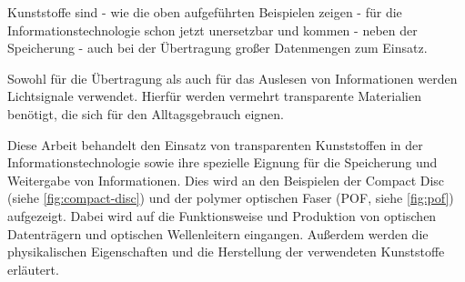 Kunststoffe sind - wie die oben aufgeführten Beispielen zeigen - für die
Informationstechnologie schon jetzt unersetzbar und kommen - neben der
Speicherung - auch bei der Übertragung großer Datenmengen zum Einsatz.

Sowohl für die Übertragung als auch für das Auslesen von Informationen werden
Lichtsignale verwendet. Hierfür werden vermehrt transparente Materialien
benötigt, die sich für den Alltagsgebrauch eignen.

Diese Arbeit behandelt den Einsatz von transparenten Kunststoffen in der
Informationstechnologie sowie ihre spezielle Eignung für die Speicherung und
Weitergabe von Informationen. Dies wird an den Beispielen der Compact Disc
(siehe \autoref{fig:compact-disc}) und der polymer optischen Faser (POF,  siehe
\autoref{fig:pof}) aufgezeigt. Dabei wird auf die Funktionsweise und Produktion
von optischen Datenträgern und optischen Wellenleitern eingangen. Außerdem
werden die physikalischen Eigenschaften und die Herstellung der verwendeten
Kunststoffe erläutert.

